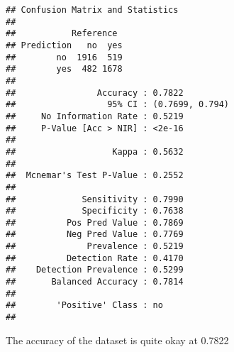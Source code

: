\documentclass[
]{article}
\begin{document}
\begin{verbatim}
## Confusion Matrix and Statistics
## 
##           Reference
## Prediction   no  yes
##        no  1916  519
##        yes  482 1678
##                                          
##                Accuracy : 0.7822         
##                  95% CI : (0.7699, 0.794)
##     No Information Rate : 0.5219         
##     P-Value [Acc > NIR] : <2e-16         
##                                          
##                   Kappa : 0.5632         
##                                          
##  Mcnemar's Test P-Value : 0.2552         
##                                          
##             Sensitivity : 0.7990         
##             Specificity : 0.7638         
##          Pos Pred Value : 0.7869         
##          Neg Pred Value : 0.7769         
##              Prevalence : 0.5219         
##          Detection Rate : 0.4170         
##    Detection Prevalence : 0.5299         
##       Balanced Accuracy : 0.7814         
##                                          
##        'Positive' Class : no             
## 
\end{verbatim}

The accuracy of the dataset is quite okay at 0.7822
\end{document}
